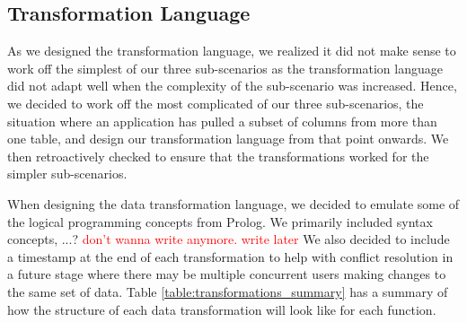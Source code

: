\documentclass[12pt]{article}
\begin{document}
\subsection{Transformation Language}
\label{sec:transformation_language}
As we designed the transformation language, we realized it did not make sense to work off the simplest of our three sub-scenarios as the transformation language did not adapt well when the complexity of the sub-scenario was increased. Hence, we decided to work off the most complicated of our three sub-scenarios, the situation where an application has pulled a subset of columns from more than one table, and design our transformation language from that point onwards. We then retroactively checked to ensure that the transformations worked for the simpler sub-scenarios.

When designing the data transformation language, we decided to emulate some of the logical programming concepts from Prolog. We primarily included syntax concepts, ...? \textcolor{red}{don't wanna write anymore. write later} We also decided to include a timestamp at the end of each transformation to help with conflict resolution in a future stage where there may be multiple concurrent users making changes to the same set of data. Table \ref{table:transformations_summary} has a summary of how the structure of each data transformation will look like for each function.
\end{document}
